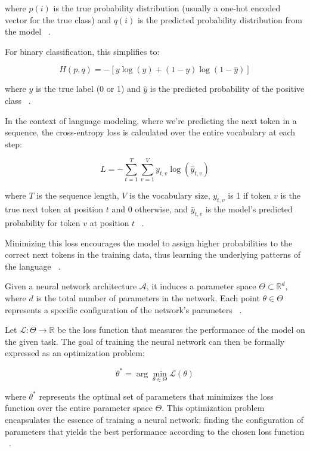 \documentclass[a4paper, oneside]{discothesis}
\begin{document}
where $p(i)$ is the true probability distribution (usually a one-hot encoded vector for the true class) and $q(i)$ is the predicted probability distribution from the model ~\cite{murphy2012machine}.

For binary classification, this simplifies to:

\begin{equation}
    H(p,q) = -[y \log(\hat{y}) + (1-y) \log(1-\hat{y})]
\end{equation}

where $y$ is the true label (0 or 1) and $\hat{y}$ is the predicted probability of the positive class ~\cite{bishop2006pattern}.

In the context of language modeling, where we're predicting the next token in a sequence, the cross-entropy loss is calculated over the entire vocabulary at each step:

\begin{equation}
    L = -\sum_{t=1}^T \sum_{v=1}^V y_{t,v} \log(\hat{y}_{t,v})
\end{equation}

where $T$ is the sequence length, $V$ is the vocabulary size, $y_{t,v}$ is 1 if token $v$ is the true next token at position $t$ and 0 otherwise, and $\hat{y}_{t,v}$ is the model's predicted probability for token $v$ at position $t$ ~\cite{jurafsky2009speech}.

Minimizing this loss encourages the model to assign higher probabilities to the correct next tokens in the training data, thus learning the underlying patterns of the language ~\cite{bengio2003neural}.

Given a neural network architecture $\mathcal{A}$, it induces a parameter space $\Theta \subset \mathbb{R}^d$, where $d$ is the total number of parameters in the network. Each point $\theta \in \Theta$ represents a specific configuration of the network's parameters ~\cite{lecun2015deep}.

Let $\mathcal{L}: \Theta \rightarrow \mathbb{R}$ be the loss function that measures the performance of the model on the given task. The goal of training the neural network can then be formally expressed as an optimization problem:

\begin{equation}
    \theta^* = \arg\min_{\theta \in \Theta} \mathcal{L}(\theta)
\end{equation}

where $\theta^*$ represents the optimal set of parameters that minimizes the loss function over the entire parameter space $\Theta$. This optimization problem encapsulates the essence of training a neural network: finding the configuration of parameters that yields the best performance according to the chosen loss function ~\cite{rumelhart1986learning}.
\end{document}
